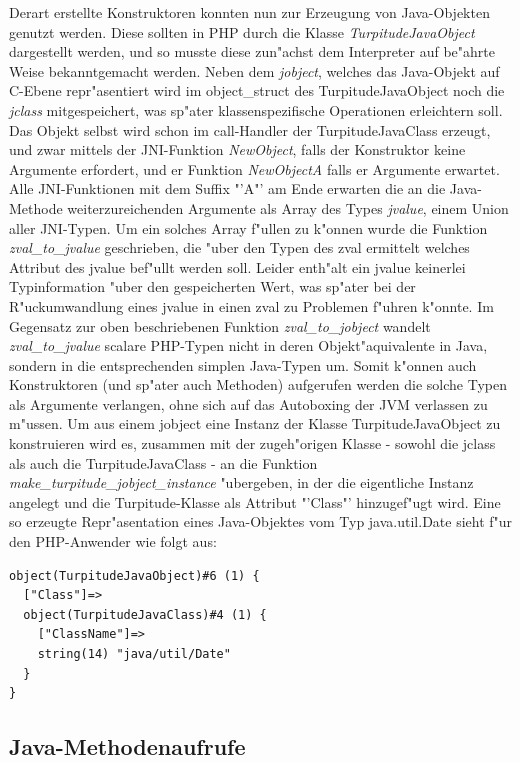 Derart erstellte Konstruktoren konnten nun zur Erzeugung von Java-Objekten genutzt werden. Diese sollten in PHP durch die Klasse
\emph{TurpitudeJavaObject} dargestellt werden, und so musste diese zun"achst dem Interpreter auf be"ahrte Weise bekanntgemacht werden.
Neben dem \emph{jobject}, welches das Java-Objekt auf C-Ebene repr"asentiert wird im object\_struct des TurpitudeJavaObject noch die \emph{jclass}
mitgespeichert, was sp"ater klassenspezifische Operationen erleichtern soll. Das Objekt selbst wird schon im call-Handler der TurpitudeJavaClass 
erzeugt, und zwar mittels der JNI-Funktion \emph{NewObject}, falls der Konstruktor keine Argumente erfordert, und er Funktion \emph{NewObjectA} falls
er Argumente erwartet. Alle JNI-Funktionen mit dem Suffix "'A"' am Ende erwarten die an die Java-Methode weiterzureichenden Argumente als Array
des Types \emph{jvalue}, einem Union aller JNI-Typen. Um ein solches Array f"ullen zu k"onnen wurde die Funktion \emph{zval\_to\_jvalue} geschrieben,
die "uber den Typen des zval ermittelt welches Attribut des jvalue bef"ullt werden soll. Leider enth"alt ein jvalue keinerlei Typinformation "uber den
gespeicherten Wert, was sp"ater bei der R"uckumwandlung eines jvalue in einen zval zu Problemen f"uhren k"onnte. Im Gegensatz zur oben beschriebenen 
Funktion \emph{zval\_to\_jobject} wandelt \emph{zval\_to\_jvalue} scalare PHP-Typen nicht in deren Objekt"aquivalente in Java, sondern in die
entsprechenden simplen Java-Typen um. Somit k"onnen auch Konstruktoren (und sp"ater auch Methoden) aufgerufen werden die solche Typen als Argumente
verlangen, ohne sich auf das Autoboxing der JVM verlassen zu m"ussen.
Um aus einem jobject eine Instanz der Klasse
TurpitudeJavaObject zu konstruieren wird es, zusammen mit der zugeh"origen Klasse - sowohl die jclass als auch die TurpitudeJavaClass - an die Funktion 
\emph{make\_turpitude\_jobject\_instance} "ubergeben, in der die eigentliche Instanz angelegt und die Turpitude-Klasse als Attribut "'Class"' hinzugef"ugt wird. 
Eine so erzeugte Repr"asentation eines Java-Objektes vom Typ java.util.Date sieht f"ur den PHP-Anwender wie folgt aus:
\begin{lstlisting}[caption=Dump eines TurpitudeJavaObject]
object(TurpitudeJavaObject)#6 (1) {
  ["Class"]=>
  object(TurpitudeJavaClass)#4 (1) {
    ["ClassName"]=>
    string(14) "java/util/Date"
  }
}
\end{lstlisting}

\subsection{Java-Methodenaufrufe}
\label{sec:chap1:impl:6}

